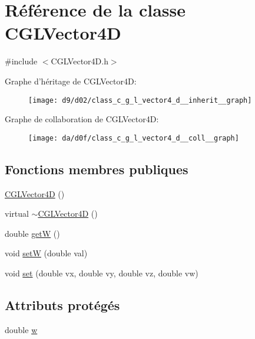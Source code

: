 \hypertarget{class_c_g_l_vector4_d}{\section{Référence de la classe C\-G\-L\-Vector4\-D}
\label{class_c_g_l_vector4_d}
}


{\ttfamily \#include $<$C\-G\-L\-Vector4\-D.\-h$>$}



Graphe d'héritage de C\-G\-L\-Vector4\-D\-:
\nopagebreak
\begin{figure}[H]
\begin{center}
\leavevmode
\texttt{[image: d9/d02/class\_c\_g\_l\_vector4\_d\_\_inherit\_\_graph]}
\end{center}
\end{figure}


Graphe de collaboration de C\-G\-L\-Vector4\-D\-:
\nopagebreak
\begin{figure}[H]
\begin{center}
\leavevmode
\texttt{[image: da/d0f/class\_c\_g\_l\_vector4\_d\_\_coll\_\_graph]}
\end{center}
\end{figure}
\subsection*{Fonctions membres publiques}
\begin{DoxyCompactItemize}
\item 
\hyperlink{class_c_g_l_vector4_d_aa722cb71a0a7eb1bc325f560535e0401}{C\-G\-L\-Vector4\-D} ()
\item 
virtual \hyperlink{class_c_g_l_vector4_d_aca6634e555c9b7778344d304b1d540a9}{$\sim$\-C\-G\-L\-Vector4\-D} ()
\item 
double \hyperlink{class_c_g_l_vector4_d_a3b9e7ede466c3a97efe8b818a11dfd3b}{get\-W} ()
\item 
void \hyperlink{class_c_g_l_vector4_d_a754d8afb0203dc8048dac865840565ae}{set\-W} (double val)
\item 
void \hyperlink{class_c_g_l_vector4_d_a9f4c89b5e30ad2cfb18327e5e17257ab}{set} (double vx, double vy, double vz, double vw)
\end{DoxyCompactItemize}
\subsection*{Attributs protégés}
\begin{DoxyCompactItemize}
\item 
double \hyperlink{class_c_g_l_vector4_d_ab9e3f6bb008e5c33aab6c847b7ad21a9}{w}
\end{DoxyCompactItemize}


